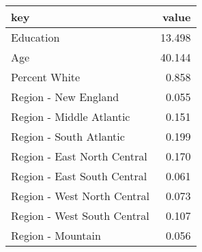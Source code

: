 \begin{tabular}{lr}
  \hline
key & value \\ 
  \hline
Education & 13.498 \\ 
  Age & 40.144 \\ 
  Percent White & 0.858 \\ 
  Region - New England & 0.055 \\ 
  Region - Middle Atlantic & 0.151 \\ 
  Region - South Atlantic & 0.199 \\ 
  Region - East North Central & 0.170 \\ 
  Region - East South Central & 0.061 \\ 
  Region - West North Central & 0.073 \\ 
  Region - West South Central & 0.107 \\ 
  Region - Mountain & 0.056 \\ 
   \hline
\end{tabular}
